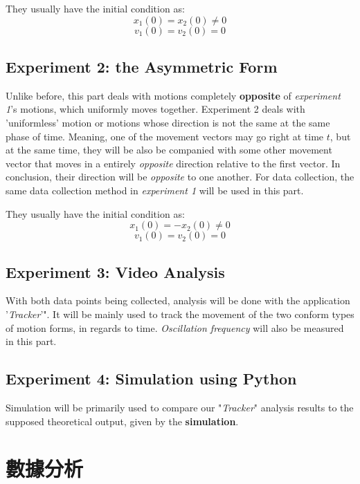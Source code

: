 \documentclass[12pt]{article}
\begin{document}
They usually have the initial condition as:
\[x_1(0)=x_2(0)\neq0\]
\[v_1(0)=v_2(0)=0\]

\subsection{Experiment 2: the Asymmetric Form}
Unlike before, this part deals with motions completely \textbf{opposite} of \textit{experiment 1}'s motions, which uniformly moves together. Experiment 2 deals with 'uniformless' motion or motions whose direction is not the same at the same phase of time. Meaning, one of the movement vectors may go right at time $t$, but at the same time, they will be also be companied with some other movement vector that moves in a entirely \textit{opposite} direction relative to the first vector. In conclusion, their direction will be \textit{opposite} to one another. For data collection, the same data collection method in \textit{experiment 1 }will be used in this part.

They usually have the initial condition as:
\[x_1(0)=-x_2(0)\neq0\]
\[v_1(0)=v_2(0)=0\]

\subsection{Experiment 3: Video Analysis}
With both data points being collected, analysis will be done with the application '\textit{Tracker}'". It will be mainly used to track the movement of the two conform types of motion forms, in regards to time. \textit{Oscillation frequency }will also be measured in this part.

\subsection{Experiment 4: Simulation using Python}
Simulation will be primarily used to compare our "\textit{Tracker}" analysis results to the supposed theoretical output, given by the \textbf{simulation}.

\section{\textbf{數據分析}}
\end{document}
